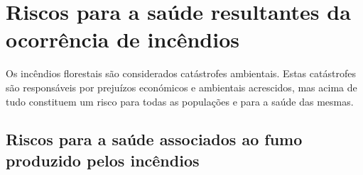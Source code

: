 \documentclass{report}
\begin{document}

\chapter{Riscos para a saúde resultantes da ocorrência de incêndios}
\cite{dgsefeitos-fumo}

Os incêndios florestais são considerados catástrofes ambientais. Estas catástrofes são responsáveis por prejuízos económicos e ambientais acrescidos, mas acima de tudo constituem um risco para todas as populações e para a saúde das mesmas.

\section{Riscos para a saúde associados ao fumo produzido pelos incêndios}
\cite{dgsefeitos-fumo}
\end{document}
